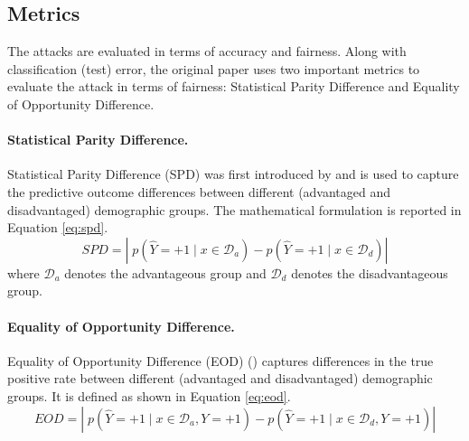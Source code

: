 \subsection{Metrics}
\label{sec:metrics}

The attacks are evaluated in terms of accuracy and fairness. Along with classification (test) error, the original paper uses two important metrics to evaluate the attack in terms of fairness: Statistical Parity Difference and Equality of Opportunity Difference.

\paragraph{Statistical Parity Difference.} Statistical Parity Difference (SPD) was first introduced by  and is used to capture the predictive outcome differences between different (advantaged and disadvantaged) demographic groups. The mathematical formulation is reported in Equation \ref{eq:spd}.
\begin{equation}
    SPD=\left|\;p\left(\hat{Y}=+1 \mid x \in \mathcal{D}_{a}\right)-p\left(\hat{Y}=+1 \mid x \in \mathcal{D}_{d}\right)\right| \label{eq:spd} 
\end{equation}
where $\mathcal{D}_{a}$ denotes the advantageous group and $\mathcal{D}_{d}$ denotes the disadvantageous group.

\paragraph{Equality of Opportunity Difference.} Equality of Opportunity Difference (EOD) () captures differences in the true positive rate between different (advantaged and disadvantaged) demographic groups. It is defined as shown in Equation \ref{eq:eod}.
\begin{equation}
    EOD=\left|\;p\left(\hat{Y}=+1 \mid x \in \mathcal{D}_{a}, Y=+1\right) -p\left(\hat{Y}=+1 \mid x \in \mathcal{D}_{d}, Y=+1\right) \right| \label{eq:eod} 
\end{equation}

